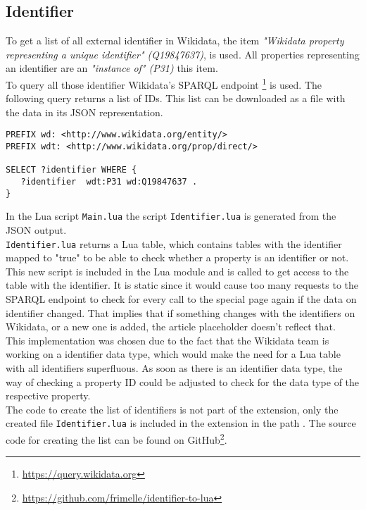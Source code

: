 \subsection{Identifier}

To get a list of all external identifier in Wikidata, the item \textit{"Wikidata property representing a unique identifier" (Q19847637)}, is used. All properties representing an identifier are an \textit{"instance of" (P31)} this item. \\
To query all those identifier Wikidata's SPARQL endpoint \footnote{\href{https://query.wikidata.org}{https://query.wikidata.org}} is used. The following query returns a list of IDs. This list can be downloaded as a file with the data in its JSON representation. \\

\begin{lstlisting}[frame=single] 
PREFIX wd: <http://www.wikidata.org/entity/>
PREFIX wdt: <http://www.wikidata.org/prop/direct/>

SELECT ?identifier WHERE {
   ?identifier  wdt:P31 wd:Q19847637 . 
}
\end{lstlisting}
In the Lua script \texttt{\justify Main.lua} the script \texttt{\justify Identifier.lua} is generated from the JSON output. \\  \texttt{\justify Identifier.lua} returns a Lua table, which contains tables with the identifier mapped to "true" to be able to check whether a property is an identifier or not. This new script is included in the Lua module and is called to get access to the table with the identifier. It is static since it would cause too many requests to the SPARQL endpoint to check for every call to the special page again if the data on identifier changed. That implies that if something changes with the identifiers on Wikidata, or a new one is added, the article placeholder doesn't reflect that. \\
This implementation was chosen due to the fact that the Wikidata team is working on a identifier data type, which would make the need for a Lua table with all identifiers superfluous. As soon as there is an identifier data type, the way of checking a property ID could be adjusted to check for the data type of the respective property. \\
The code to create the list of identifiers is not part of the extension, only the created file \texttt{\justify Identifier.lua} is included in the extension in the path . The source code for creating the list can be found on GitHub\footnote{\href{https://github.com/frimelle/identifier-to-lua}{https://github.com/frimelle/identifier-to-lua}}. 
